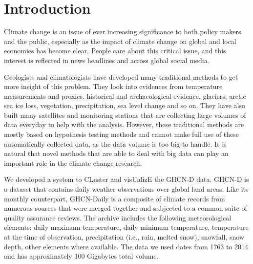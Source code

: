 \section{Introduction}
Climate change is an issue of ever increasing significance to both policy makers and the public, especially as the impact of climate change on global and local economies has become clear. People care about this critical issue, and this interest is reflected in news headlines and across global social media.

Geologists and climatologists have developed many traditional methods to  get more insight of this problem. They look into evidences from temperature measurements and proxies, historical and archaeological evidence, glaciers, arctic sea ice loss, vegetation, precipitation, sea level change and so on. They have also built many satellites and monitoring stations that are collecting large volumes of data everyday to help with the analysis. However, these traditional methods are
mostly based on hypothesis testing methods and cannot make full use of these automatically collected data, as the data volume is too big to handle. It is natural that novel methods that are able to deal with big data can play an important role in the climate change research.

We developed a system to CLuster and visUalizE the GHCN-D data\cite{GHCN-D}.
GHCN-D is a dataset that contains daily weather observations over global land areas.
Like its monthly counterpart, GHCN-Daily is a composite of climate records from
numerous sources that were merged together and subjected to a common suite of quality assurance reviews. The archive includes the following meteorological elements: daily maximum temperature, daily minimum temperature, temperature at the time of observation, precipitation (i.e., rain, melted snow), snowfall, snow depth, other elements where available. The data we used dates from 1763 to 2014 and has approximately 100 Gigabytes total volume.

